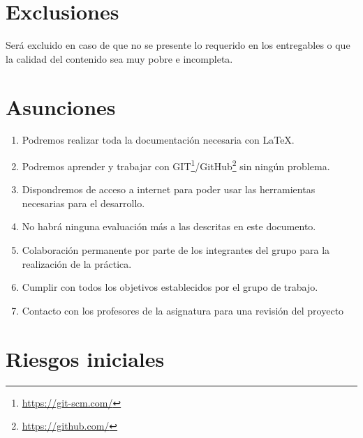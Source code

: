 \documentclass[a4paper,10pt]{scrartcl}
\begin{document}
\section{Exclusiones}
Será excluido en caso de que no se presente lo requerido en los entregables o que la calidad del contenido sea muy pobre e incompleta.


\section{Asunciones}

	\begin{enumerate}
		\item Podremos realizar toda la documentación necesaria con \LaTeX.
		
		\item Podremos aprender y trabajar con GIT\footnote{\url{https://git-scm.com/}}/GitHub\footnote{\url{https://github.com/}} sin ningún problema.
		
		\item Dispondremos de acceso a internet para poder usar las herramientas necesarias para el desarrollo.

		\item No habrá ninguna evaluación más a las descritas en este documento.
		
		\item Colaboración permanente por parte de los integrantes del grupo para la realización de la práctica.
		
		\item Cumplir con todos los objetivos establecidos por el grupo de trabajo.
		
		\item Contacto con los profesores de la asignatura para una revisión del proyecto
	\end{enumerate}


\section{Riesgos iniciales}
\end{document}
